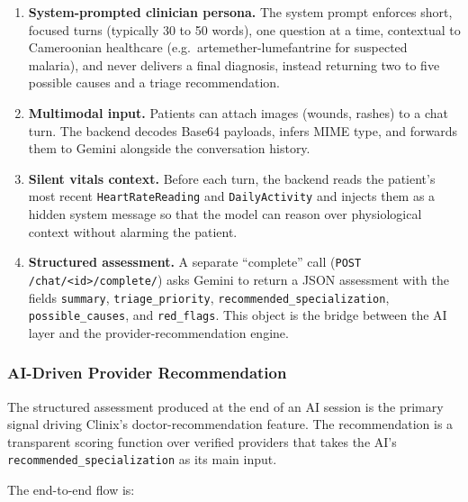\begin{enumerate}
  \item \textbf{System-prompted clinician persona.} The system prompt enforces short, focused turns (typically 30 to 50 words), one question at a time, contextual to Cameroonian healthcare (e.g.\ artemether-lumefantrine for suspected malaria), and never delivers a final diagnosis, instead returning two to five possible causes and a triage recommendation.
  \item \textbf{Multimodal input.} Patients can attach images (wounds, rashes) to a chat turn. The backend decodes Base64 payloads, infers MIME type, and forwards them to Gemini alongside the conversation history.
  \item \textbf{Silent vitals context.} Before each turn, the backend reads the patient's most recent \texttt{HeartRateReading} and \texttt{DailyActivity} and injects them as a hidden system message so that the model can reason over physiological context without alarming the patient.
  \item \textbf{Structured assessment.} A separate ``complete'' call (\texttt{POST /chat/<id>/complete/}) asks Gemini to return a JSON assessment with the fields \texttt{summary}, \texttt{triage\_priority}, \texttt{recommended\_specialization}, \texttt{possible\_causes}, and \texttt{red\_flags}. This object is the bridge between the AI layer and the provider-recommendation engine.
\end{enumerate}

\subsubsection*{AI-Driven Provider Recommendation}

The structured assessment produced at the end of an AI session is the primary signal driving Clinix's doctor-recommendation feature. The recommendation is a transparent scoring function over verified providers that takes the AI's \texttt{recommended\_specialization} as its main input.

The end-to-end flow is:

